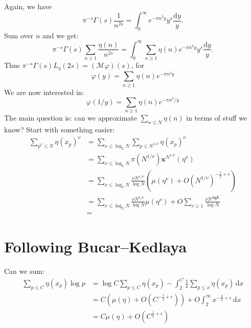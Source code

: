 \documentclass{article}
\newcommand{\bx}{\boldsymbol{x}}
\newcommand{\cM}{\mathcal{M}}
\newcommand{\dd}{\mathrm{d}}
\theoremstyle{definition}
\begin{document}
Again, we have 
\[
	\pi^{-s} \Gamma(s) \frac{1}{n^{2s}} = \int_0^\infty e^{-\pi n^2 y} y^{s} \frac{\dd y}{y} .
\]
Sum over $n$ and we get:
\[
	\pi^{-s} \Gamma(s) \sum_{n\geqslant 1} \frac{\eta(n)}{n^{2s}} =  \int_0^\infty\sum_{n\geqslant 1} \eta(n) e^{-\pi n^2 y} y^{s} \frac{\dd y}{y} .
\]
Thus $\pi^{-s} \Gamma(s) L_\eta(2s) = (\cM\varphi)(s)$, for 
\[
	\varphi(y) = \sum_{n\geqslant 1} \eta(n) e^{-\pi n^2 y}
\]
We are now interested in:
\[
	\varphi(1/y) = \sum_{n\geqslant 1} \eta(n) e^{-\pi n^2 / y}
\]
The main question is: can we approximate $\sum_{n\leqslant N} \eta(n)$ in terms 
of stuff we know? Start with something easier:
\begin{align*}
	\sum_{p^\nu\leqslant N} \eta(x_p)^\nu
		&= \sum_{\nu\leqslant \log_2 N} \sum_{p\leqslant N^{1/\nu}} \eta(x_p)^\nu \\
		&= \sum_{\nu\leqslant \log_2 N} \pi(N^{1/\nu}) \bx^{N^{1/\nu}}(\eta^\nu) \\
		&= \sum_{\nu\leqslant \log_2 N} \frac{\nu N^{1/\nu}}{\log N} (\mu(\eta^\nu)+O(N^{1/\nu})^{-\frac 1 2+\epsilon}) \\
		&= \sum_{\nu\leqslant \log_2 N} \frac{\nu N^{1/\nu}}{\log N} \mu(\eta^\nu) + O \sum_{\nu\geqslant 1} \frac{\nu N^{\frac{1+2\epsilon}{2\nu}}}{\log N} \\
		&=
\end{align*}





\section{Following Bucar--Kedlaya}

Can we sum:
\begin{align*}
	\sum_{p\leqslant C} \eta(x_p) \log p 
		&= \log C \sum_{p\leqslant C} \eta(x_p) - \int_2^C \frac{1}{x} \sum_{p\leqslant x} \eta(x_p) \, \dd x \\
		&= C (\mu(\eta)+O(C^{-\frac 1 2+\epsilon})) + O \int_2^\infty x^{-\frac 3 2+\epsilon}\, \dd x \\
		&= C \mu(\eta)+ O(C^{\frac 1 2+\epsilon})
\end{align*}





\printbibliography
\end{document}
